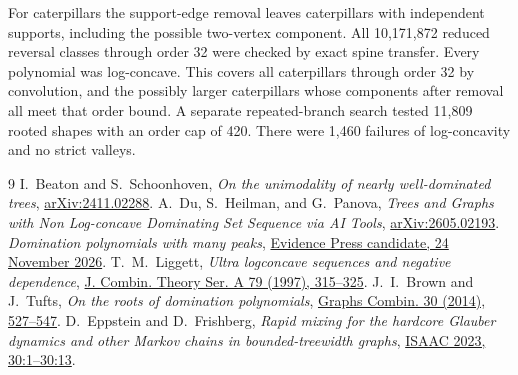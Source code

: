 \documentclass[10pt]{article}
\begin{document}
For caterpillars the support-edge removal leaves caterpillars with
independent supports, including the possible two-vertex component.
All 10,171,872 reduced reversal classes through order 32 were
checked by exact spine transfer. Every polynomial was log-concave.
This covers all caterpillars through order 32 by convolution, and
the possibly larger caterpillars whose components after removal
all meet that order bound. A separate repeated-branch search
tested 11,809 rooted shapes with an order cap of 420.
There were 1,460 failures of log-concavity and no strict valleys.

\begin{thebibliography}{9}
 I.~Beaton and S.~Schoonhoven,
\emph{On the unimodality of nearly well-dominated trees},
\href{https://arxiv.org/abs/2411.02288}{arXiv:2411.02288}.
 A.~Du, S.~Heilman, and G.~Panova,
\emph{Trees and Graphs with Non Log-concave Dominating Set Sequence via AI Tools},
\href{https://arxiv.org/abs/2605.02193}{arXiv:2605.02193}.
 \emph{Domination polynomials with many peaks},
\href{https://evidencepress.org/releases/domination-polynomial-unimodality-counterexamples/}
{Evidence Press candidate, 24 November 2026}.
 T.~M.~Liggett,
\emph{Ultra logconcave sequences and negative dependence},
\href{https://doi.org/10.1006/jcta.1997.2790}{J. Combin. Theory Ser. A 79 (1997), 315--325}.
 J.~I.~Brown and J.~Tufts,
\emph{On the roots of domination polynomials},
\href{https://doi.org/10.1007/s00373-013-1306-z}{Graphs Combin. 30 (2014), 527--547}.
 D.~Eppstein and D.~Frishberg,
\emph{Rapid mixing for the hardcore Glauber dynamics and other Markov
chains in bounded-treewidth graphs},
\href{https://doi.org/10.4230/LIPIcs.ISAAC.2023.30}{ISAAC 2023, 30:1--30:13}.
\end{thebibliography}
\end{document}
